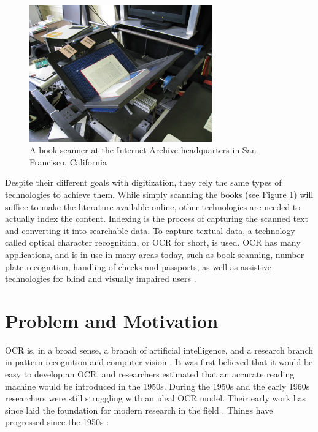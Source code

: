 \begin{figure}[ht]
    \centering
    \includegraphics[width=0.7\textwidth]{fig/chapter1/Internet_Archive_book_scanner_1.jpg}
    \captionsetup{justification=centering}
    \caption{A book scanner at the Internet Archive headquarters in San Francisco, California}
    \label{ref:book_scanner}
\end{figure}

Despite their different goals with digitization, they rely the same types of technologies to achieve them. While simply scanning the books (see Figure \ref{ref:book_scanner}) will suffice to make the literature available online, other technologies are needed to actually index the content. Indexing is the process of capturing the scanned text and converting it into searchable data. To capture textual data, a technology called optical character recognition, or OCR for short, is used. OCR has many applications, and is in use in many areas today, such as book scanning, number plate recognition, handling of checks and passports, as well as assistive technologies for blind and visually impaired users \citep{mori1999optical, kurzweil2000reading}.


\section{Problem and Motivation}
\label{sec:problem_motivation}
OCR is, in a broad sense, a branch of artificial intelligence, and a research branch in pattern recognition and computer vision \citep{mori1999optical}. It was first believed that it would be easy to develop an OCR, and researchers estimated that an accurate reading machine would be introduced in the 1950s. During the 1950s and the early 1960s researchers were still struggling with an ideal OCR model. Their early work has since laid the foundation for modern research in the field \citep{mori1992historical}. Things have progressed since the 1950s \citep{ye2015text}:

